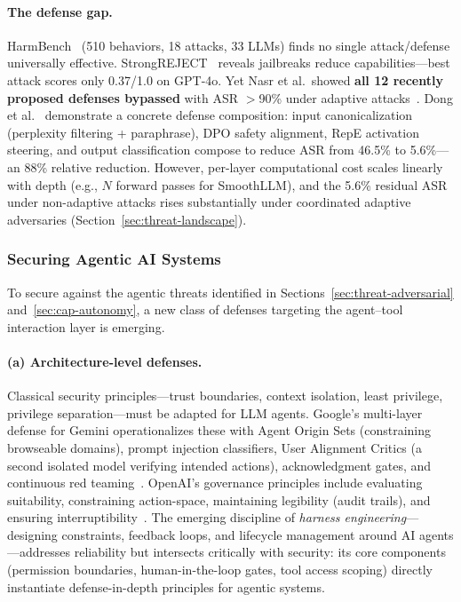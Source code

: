 \paragraph{The defense gap.}
HarmBench~\cite{mazeika2024harmbench} (510 behaviors, 18 attacks, 33 LLMs) finds no single attack/defense universally effective. StrongREJECT~\cite{souly2024strongreject} reveals jailbreaks reduce capabilities---best attack scores only 0.37/1.0 on GPT-4o. Yet Nasr et al.\ showed \textbf{all 12 recently proposed defenses bypassed} with ASR $>$90\% under adaptive attacks~\cite{nasr2025attacker}. Dong et al.~\cite{dong2024hierarchical} demonstrate a concrete defense composition: input canonicalization (perplexity filtering + paraphrase), DPO safety alignment, RepE activation steering, and output classification compose to reduce ASR from 46.5\% to 5.6\%---an 88\% relative reduction. However, per-layer computational cost scales linearly with depth (e.g., $N$ forward passes for SmoothLLM), and the 5.6\% residual ASR under non-adaptive attacks rises substantially under coordinated adaptive adversaries (Section~\ref{sec:threat-landscape}).


\subsubsection{Securing Agentic AI Systems}
\label{sec:agentic-security}


To secure against the agentic threats identified in Sections~\ref{sec:threat-adversarial} and~\ref{sec:cap-autonomy}, a new class of defenses targeting the agent--tool interaction layer is emerging.

\paragraph{(a) Architecture-level defenses.}
Classical security principles---trust boundaries, context isolation, least privilege, privilege separation---must be adapted for LLM agents. Google's multi-layer defense for Gemini operationalizes these with Agent Origin Sets (constraining browseable domains), prompt injection classifiers, User Alignment Critics (a second isolated model verifying intended actions), acknowledgment gates, and continuous red teaming~\cite{google2025geminidefense}. OpenAI's governance principles include evaluating suitability, constraining action-space, maintaining legibility (audit trails), and ensuring interruptibility~\cite{shavit2024agenticgovernance}. The emerging discipline of \emph{harness engineering}---designing constraints, feedback loops, and lifecycle management around AI agents---addresses reliability but intersects critically with security: its core components (permission boundaries, human-in-the-loop gates, tool access scoping) directly instantiate defense-in-depth principles for agentic systems.

